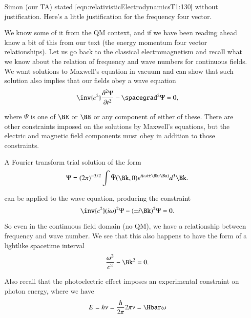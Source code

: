 %
%

Simon (our TA) stated \cref{eqn:relativisticElectrodynamicsT1:130} without justification.  Here's a little justification for the frequency four vector.

We know some of it from the QM context, and if we have been reading ahead know a bit of this from our text \citep{landau1980classical} (the energy momentum four vector relationships).  Let us go back to the classical electromagnetism and recall what we know about the relation of frequency and wave numbers for continuous fields.  We want solutions to Maxwell's equation in vacuum and can show that such solution also implies that our fields obey a wave equation
%
\begin{equation}\label{eqn:relativisticElectrodynamicsT1:131}
\inv{c^2} \frac{\partial^2 \Psi}{\partial t^2} - \spacegrad^2 \Psi = 0,
\end{equation}

where \(\Psi\) is one of \(\BE\) or \(\BB\) or any component of either of these.  There are other constraints imposed on the solutions by Maxwell's equations, but the electric and magnetic field components must obey  in addition to those constraints.

A Fourier transform trial solution of the form
%
\begin{equation}\label{eqn:relativisticElectrodynamicsT1:132}
\Psi = (2 \pi)^{-3/2} \int \tilde{\Psi}(\Bk, 0) e^{i (\omega t \pm \Bk \cdot \Bx) } d^3 \Bk.
\end{equation}

can be applied to the wave equation, producing the constraint
%
\begin{equation}\label{eqn:relativisticElectrodynamicsT1:133}
\inv{c^2} (i \omega)^2 \Psi - (\pm i \Bk)^2 \Psi = 0.
\end{equation}

So even in the continuous field domain (no QM), we have a relationship between frequency and wave number.  We see that this also happens to have the form of a lightlike spacetime interval
%
\begin{equation}\label{eqn:relativisticElectrodynamicsT1:134}
\frac{\omega^2}{c^2} - \Bk^2 = 0.
\end{equation}

Also recall that the photoelectric effect imposes an experimental constraint on photon energy, where we have
%
\begin{equation}\label{eqn:relativisticElectrodynamicsT1:135}
E = h \nu = \frac{h}{2\pi} 2 \pi \nu = \Hbar \omega
\end{equation}

